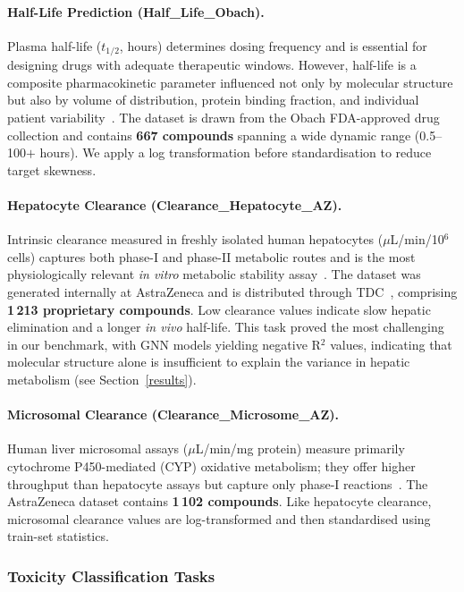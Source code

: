 \documentclass[12pt]{article}
\begin{document}
\paragraph{Half-Life Prediction (Half\_Life\_Obach).}
Plasma half-life ($t_{1/2}$, hours) determines dosing frequency and is essential for
designing drugs with adequate therapeutic windows.  However, half-life is a composite
pharmacokinetic parameter influenced not only by molecular structure but also by
volume of distribution, protein binding fraction, and individual patient
variability~\cite{obach1999prediction}.  The dataset is drawn from the Obach
FDA-approved drug collection and contains \textbf{667 compounds}
spanning a wide dynamic range (0.5--100$+$ hours).  We apply a log transformation
before standardisation to reduce target skewness.

\paragraph{Hepatocyte Clearance (Clearance\_Hepatocyte\_AZ).}
Intrinsic clearance measured in freshly isolated human hepatocytes
($\mu$L/min/10$^6$ cells) captures both phase-I and phase-II metabolic routes and
is the most physiologically relevant \emph{in vitro} metabolic stability
assay~\cite{riley2001pharma}.  The dataset was generated internally at AstraZeneca
and is distributed through TDC~\cite{huang2021therapeuticsdatacommonsmachine},
comprising \textbf{1\,213 proprietary compounds}.
Low clearance values indicate slow hepatic elimination and a longer \emph{in vivo}
half-life.  This task proved the most challenging in our benchmark, with GNN models
yielding negative R$^2$ values, indicating that molecular structure alone is
insufficient to explain the variance in hepatic metabolism (see
Section~\ref{results}).

\paragraph{Microsomal Clearance (Clearance\_Microsome\_AZ).}
Human liver microsomal assays ($\mu$L/min/mg protein) measure primarily cytochrome
P450-mediated (CYP) oxidative metabolism; they offer higher throughput than
hepatocyte assays but capture only phase-I reactions~\cite{obach2006trend}.  The
AstraZeneca dataset contains \textbf{1\,102 compounds}.
Like hepatocyte clearance, microsomal clearance values are log-transformed and
then standardised using train-set statistics.

\subsubsection*{Toxicity Classification Tasks}
\end{document}
